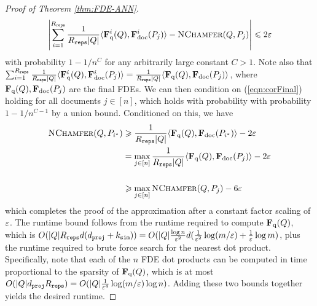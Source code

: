 \begin{proof}[Proof of Theorem \ref{thm:FDE-ANN}]
\begin{equation}\label{eqn:corFinal}
    \left| \sum_{i=1}^{R_{\texttt{reps}}} \frac{1}{R_{\texttt{reps}}|Q|}\langle \mathbf{F}_{\text{q}}^i(Q) , \mathbf{F}_{\text{doc}}^i(P_j) \rangle - \textsc{NChamfer}(Q,P_j) \right| \leqslant 2\varepsilon
\end{equation}
with probability $1-1/n^C$ for any arbitrarily large constant $C>1$. Note also that $ \sum_{i=1}^{R_{\texttt{reps}}} \frac{1}{R_{\texttt{reps}}|Q|}\langle \mathbf{F}_{\text{q}}^i(Q) , \mathbf{F}_{\text{doc}}^i(P_j)\rangle =  \frac{1}{R_{\texttt{reps}}|Q|}\langle \mathbf{F}_{\text{q}}(Q) , \mathbf{F}_{\text{doc}}(P_j)\rangle$, where $\mathbf{F}_{\text{q}}(Q) , \mathbf{F}_{\text{doc}}(P_j)$ are the final FDEs. We can then condition on (\ref{eqn:corFinal}) holding for all documents $j \in [n]$, which holds with probability with probability $1-1/n^{C-1}$ by a union bound. Conditioned on this, we have  
\begin{equation}
    \begin{split}
        \textsc{NChamfer}(Q,P_{i^*}) &\geqslant  \frac{1}{R_{\texttt{reps}}|Q|}\langle \mathbf{F}_{\text{q}}(Q) , \mathbf{F}_{\text{doc}}(P_{i^*})  \rangle - 2\varepsilon\\
        &= \max_{j \in [n]}\frac{1}{R_{\texttt{reps}}|Q|}\langle \mathbf{F}_{\text{q}}(Q) , \mathbf{F}_{\text{doc}}(P_{j})  \rangle  - 2\varepsilon\\\\
        & \geqslant \max_{j \in [n]} \textsc{NChamfer}(Q,P_j) - 6\varepsilon
    \end{split}
\end{equation}
which completes the proof of the approximation after a constant factor scaling of $\varepsilon$. The runtime bound follows from the runtime required to compute $\mathbf{F}_{\text{q}}(Q)$, which is $O(|Q| R_{\texttt{reps}} d (d_{\texttt{proj}} + k_{\texttt{sim}})) = O(|Q| \frac{\log n}{\varepsilon^2} d (\frac{1}{\varepsilon^2} \log(m/\varepsilon) + \frac{1}{\varepsilon}\log m) $, plus the runtime required to brute force search for the nearest dot product. Specifically, note that each of the $n$ FDE dot products can be computed in time proportional to the sparsity of $\mathbf{F}_{\text{q}}(Q)$, which is at most $O(|Q| d_{\texttt{proj}} R_{\texttt{reps}}) = O(|Q| \frac{1}{\varepsilon^4} \log(m/\varepsilon) \log n)$. Adding these two bounds together yields the desired runtime. 
\end{proof}






